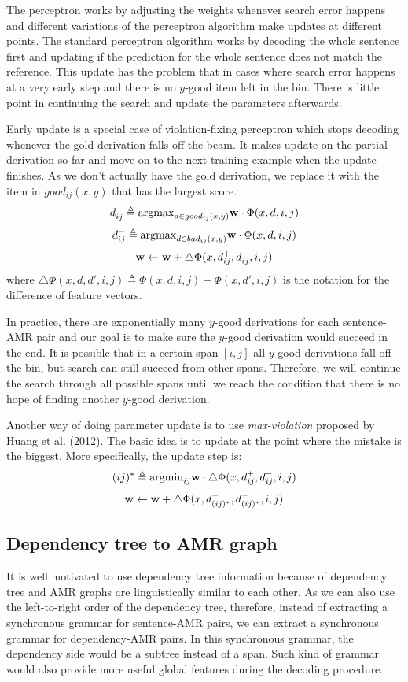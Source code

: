 The perceptron works by adjusting the weights whenever search error happens and different variations of the perceptron algorithm make updates
at different points. The standard perceptron algorithm works by decoding the whole sentence first and updating if the prediction for the whole
sentence does not match the reference. This update has the problem that in cases where search error happens at a very early step and there is
no $y$-good item left in the bin. There is little point in continuing the search and update the parameters afterwards.


Early update is a special case of violation-fixing perceptron which stops decoding whenever the gold derivation falls off the beam. It makes update on the partial derivation so far and 
move on to the next training example when the update finishes. As we don't actually have the gold derivation, we replace it with
the item in $good_{ij}(x,y)$ that has the largest score.
$$d_{ij}^{+} \triangleq {\bf \argmax}_{d\in good_{ij}(x,y)} {\bf w}\cdot \Phi(x, d, i, j)$$
$$d_{ij}^{-} \triangleq {\bf \argmax}_{d\in bad_{ij}(x,y)} {\bf w}\cdot \Phi(x, d, i, j)$$
$${\bf w} \leftarrow {\bf w} + \triangle \Phi(x, d_{ij}^{+}, d_{ij}^{-}, i, j)$$
where $\triangle \Phi(x, d, d', i, j) \triangleq \Phi(x, d, i, j) - \Phi(x, d', i, j)$ is the notation for the difference of feature vectors.


In practice, there are exponentially many $y$-good derivations for each sentence-AMR pair and our goal is to make sure the $y$-good derivation would succeed in the end. 
It is possible that in a certain span $[i,j]$ all $y$-good derivations fall off the bin, but search can still succeed from other spans.
Therefore, we will continue the search through all possible spans until we reach the condition that there is no hope of finding another 
$y$-good derivation.


Another way of doing parameter update is to use \textit{max-violation} proposed by Huang et al. (2012). The basic idea is to update at the
point where the mistake is the biggest. More specifically, the update step is:
$$(ij)^{*} \triangleq {\argmin}_{ij} {\bf w} \cdot \triangle \Phi(x, d_{ij}^{+}, d_{ij}^{-}, i, j)$$
$${\bf w} \leftarrow {\bf w} + \triangle \Phi(x, d_{(ij)^*}^{+}, d_{(ij)^*}^{-}, i, j)$$

\subsection{Dependency tree to AMR graph}
It is well motivated to use dependency tree information because of dependency tree and AMR graphs are linguistically similar to each other.
As we can also use the left-to-right order of the dependency tree, therefore, instead of extracting a synchronous grammar for sentence-AMR pairs, we can
extract a synchronous grammar for dependency-AMR pairs.
In this synchronous grammar, the dependency side would be a subtree instead of a span. Such kind of grammar would also provide more useful global features during the decoding procedure.

